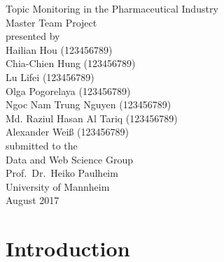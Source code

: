 \documentclass[11pt,titlepage,oneside,openany]{book}
\begin{document}
\begin{titlepage}
	\vspace*{2cm}
  \begin{center}
   {\Large Topic Monitoring in the Pharmaceutical Industry\\}
   \vspace{2cm} 
   {Master Team Project\\}
   \vspace{2cm}
   {presented by\\
    Hailian Hou (123456789)\\
    Chia-Chien Hung (123456789)\\
    Lu Lifei (123456789)\\
    Olga Pogorelaya (123456789)\\
    Ngoc Nam Trung Nguyen (123456789) \\
    Md. Raziul Hasan Al Tariq (123456789)\\
    Alexander Wei{\ss} (123456789)\\
   }
   \vspace{1cm} 
   {submitted to the\\
    Data and Web Science Group\\
    Prof.\ Dr.\ Heiko Paulheim\\
    University of Mannheim\\} \vspace{2cm}
   {August 2017}
  \end{center}
\end{titlepage} 

\tableofcontents
\newpage

\listofalgorithms

\listoffigures

\listoftables

\printglossary[type=\acronymtype,style=long, nonumberlist]


\newpage



\chapter{Introduction}
\label{cha:intro}
\end{document}
